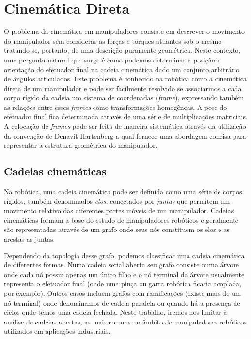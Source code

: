 \section{Cinemática Direta}

O problema da cinemática em manipuladores consiste em descrever o movimento do
manipulador sem considerar as forças e torques atuantes sob o mesmo
tratando-se, portanto, de uma descrição puramente geométrica. Neste contexto,
uma pergunta natural que surge é como podemos determinar a posição e orientação
do efetuador final na cadeia cinemática dado um conjunto arbitrário de ângulos
articulados. Este problema é conhecido na robótica como a cinemática direta de
um manipulador e pode ser facilmente resolvido se associarmos a cada corpo
rígido da cadeia um sistema de coordenadas (\emph{frame}), expressando também
as relações entre esses \emph{frames} como transformações homogêneas. A pose do
efetuador final fica determinada através de uma série de multiplicações
matriciais. A colocação de \emph{frames} pode ser feita de maneira sistemática
através da utilização da convenção de Denavit-Hartenberg a qual fornece uma
abordagem concisa para representar a estrutura geométrica do manipulador.

\subsection{Cadeias cinemáticas}

Na robótica, uma cadeia cinemática pode ser definida como uma série de corpos
rígidos, também denominados \emph{elos}, conectados por \emph{juntas} que
permitem um movimento relativo das diferentes partes móveis de um manipulador.
Cadeias cinemáticas formam a base do estudo de manipuladores robóticos e
geralmente são representadas através de um grafo onde seus nós constituem os
elos e as arestas as juntas.

Dependendo da topologia desse grafo, podemos classificar uma cadeia cinemática
de diferentes formas. Numa cadeia serial aberta seu grafo consiste numa árvore
onde cada nó possui apenas um único filho e o nó terminal da árvore usualmente
representa o efetuador final (onde uma pinça ou garra robótica ficaria
acoplada, por exemplo). Outros casos incluem grafos com ramificações (existe
mais de um nó terminal) onde denominamos de cadeia paralela ou quando há a
presença de ciclos onde temos uma cadeia fechada. Neste trabalho, iremos nos
limitar à análise de cadeias abertas, as mais comuns no âmbito de manipuladores
robóticos utilizados em aplicações industriais.

